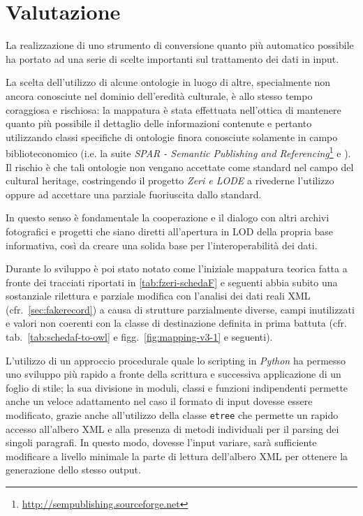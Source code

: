 \chapter{Valutazione}

La realizzazione di uno strumento di conversione quanto più automatico possibile ha portato ad una serie di scelte importanti sul trattamento dei dati in input.

La scelta dell'utilizzo di alcune ontologie in luogo di altre, specialmente non ancora conosciute nel dominio dell'eredità culturale, è allo stesso tempo coraggiosa e rischiosa: la mappatura è stata effettuata nell'ottica di mantenere quanto più possibile il dettaglio delle informazioni contenute e pertanto utilizzando classi specifiche di ontologie finora conosciute solamente in campo biblioteconomico (i.e. la suite \emph{SPAR - Semantic Publishing and Referencing}\footnote{\url{http://sempublishing.sourceforge.net}} e \cite{6}). Il rischio è che tali ontologie non vengano accettate come standard nel campo del cultural heritage, costringendo il progetto \emph{Zeri e LODE} a rivederne l'utilizzo oppure ad accettare una parziale fuoriuscita dallo standard.

In questo senso è fondamentale la cooperazione e il dialogo con altri archivi fotografici e progetti che siano diretti all'apertura in LOD della propria base informativa, così da creare una solida base per l'interoperabilità dei dati.

Durante lo sviluppo è poi stato notato come l'iniziale mappatura teorica fatta a fronte dei tracciati riportati in \ref{tab:fzeri-schedaF} e seguenti abbia subito una sostanziale rilettura e parziale modifica con l'analisi dei dati reali XML (cfr.~\ref{sec:fakerecord}) a causa di strutture parzialmente diverse, campi inutilizzati e valori non coerenti con la classe di destinazione definita in prima battuta (cfr. tab.~\ref{tab:schedaf-to-owl} e figg.~\ref{fig:mapping-v3-1} e seguenti).

L'utilizzo di un approccio procedurale quale lo scripting in \emph{Python} ha permesso uno sviluppo più rapido a fronte della scrittura e successiva applicazione di un foglio di stile; la sua divisione in moduli, classi e funzioni indipendenti permette anche un veloce adattamento nel caso il formato di input dovesse essere modificato, grazie anche all'utilizzo della classe \texttt{etree} che permette un rapido accesso all'albero XML e alla presenza di metodi individuali per il parsing dei singoli paragrafi. In questo modo, dovesse l'input variare, sarà sufficiente modificare a livello minimale la parte di lettura dell'albero XML per ottenere la generazione dello stesso output.

